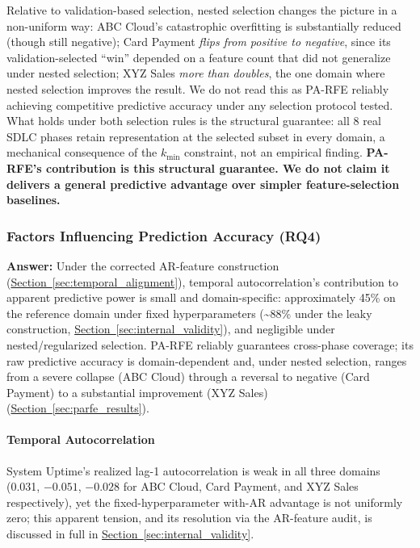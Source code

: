 \documentclass[technologies,article,submit,pdftex,moreauthors]{Definitions/mdpi}
\begin{document}
Relative to validation-based selection, nested selection changes the picture in a non-uniform way: ABC Cloud's catastrophic overfitting is substantially reduced (though still negative); Card Payment \emph{flips from positive to negative}, since its validation-selected ``win'' depended on a feature count that did not generalize under nested selection; XYZ Sales \emph{more than doubles}, the one domain where nested selection improves the result. We do not read this as PA-RFE reliably achieving competitive predictive accuracy under any selection protocol tested. What holds under both selection rules is the structural guarantee: all 8 real SDLC phases retain representation at the selected subset in every domain, a mechanical consequence of the \(k_{\min}\) constraint, not an empirical finding. \textbf{PA-RFE's contribution is this structural guarantee. We do not claim it delivers a general predictive advantage over simpler feature-selection baselines.}

\subsubsection{Factors Influencing Prediction Accuracy (RQ4)}\label{sec:rq4_factors}

\textbf{Answer:} Under the corrected AR-feature construction (\hyperref[sec:temporal_alignment]{Section~\ref*{sec:temporal_alignment}}), temporal autocorrelation's contribution to apparent predictive power is small and domain-specific: approximately 45\% on the reference domain under fixed hyperparameters (\textasciitilde88\% under the leaky construction, \hyperref[sec:internal_validity]{Section~\ref*{sec:internal_validity}}), and negligible under nested/regularized selection. PA-RFE reliably guarantees cross-phase coverage; its raw predictive accuracy is domain-dependent and, under nested selection, ranges from a severe collapse (ABC Cloud) through a reversal to negative (Card Payment) to a substantial improvement (XYZ Sales) (\hyperref[sec:parfe_results]{Section~\ref*{sec:parfe_results}}).

\paragraph{Temporal Autocorrelation}\label{sec:temporal_autocorrelation}

System Uptime's realized lag-1 autocorrelation is weak in all three domains (0.031, \(-0.051\), \(-0.028\) for ABC Cloud, Card Payment, and XYZ Sales respectively), yet the fixed-hyperparameter with-AR advantage is not uniformly zero; this apparent tension, and its resolution via the AR-feature audit, is discussed in full in \hyperref[sec:internal_validity]{Section~\ref*{sec:internal_validity}}.
\end{document}
